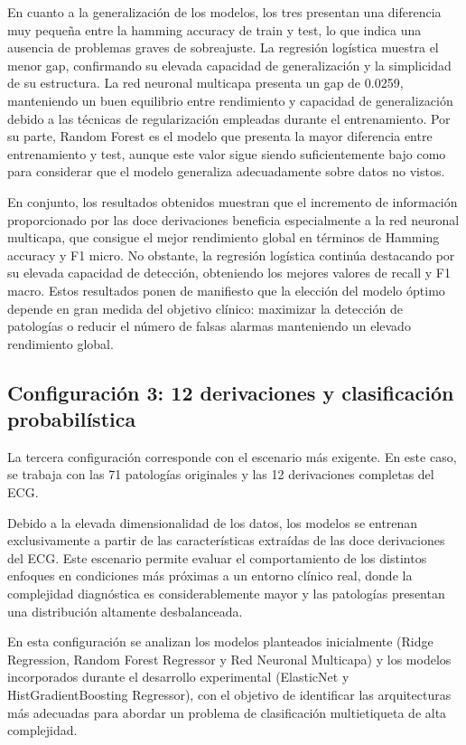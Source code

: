 \documentclass[12pt,a4paper,twoside]{book}
\begin{document}
En cuanto a la generalización de los modelos, los tres presentan una diferencia muy pequeña entre la hamming accuracy de train y test, lo que indica una ausencia de problemas graves de sobreajuste.
La regresión logística muestra el menor gap, confirmando su elevada capacidad de generalización y la simplicidad de su estructura. 
La red neuronal multicapa presenta un gap de 0.0259, manteniendo un buen equilibrio entre rendimiento y capacidad de generalización debido a las técnicas de regularización empleadas durante el entrenamiento. 
Por su parte, Random Forest es el modelo que presenta la mayor diferencia entre entrenamiento y test, aunque este valor sigue siendo suficientemente bajo como para considerar que el modelo generaliza adecuadamente sobre datos no vistos.

\vspace{0.5cm}

En conjunto, los resultados obtenidos muestran que el incremento de información proporcionado por las doce derivaciones beneficia especialmente a la red neuronal multicapa, que consigue el mejor rendimiento global en términos de Hamming accuracy y F1 micro. 
No obstante, la regresión logística continúa destacando por su elevada capacidad de detección, obteniendo los mejores valores de recall y F1 macro. 
Estos resultados ponen de manifiesto que la elección del modelo óptimo depende en gran medida del objetivo clínico: maximizar la detección de patologías o reducir el número de falsas alarmas manteniendo un elevado rendimiento global.

\subsection{Configuración 3: 12 derivaciones y clasificación probabilística}

La tercera configuración corresponde con el escenario más exigente. 
En este caso, se trabaja con las 71 patologías originales y las 12 derivaciones completas del ECG.

Debido a la elevada dimensionalidad de los datos, los modelos se entrenan exclusivamente a partir de las características extraídas de las doce derivaciones del ECG. 
Este escenario permite evaluar el comportamiento de los distintos enfoques en condiciones más próximas a un entorno clínico real, donde la complejidad diagnóstica es considerablemente mayor y las patologías presentan una distribución altamente desbalanceada.

En esta configuración se analizan los modelos planteados inicialmente (Ridge Regression, Random Forest Regressor y Red Neuronal Multicapa) y los modelos incorporados durante el desarrollo experimental (ElasticNet y HistGradientBoosting Regressor), con el objetivo de identificar las arquitecturas más adecuadas para abordar un problema de clasificación multietiqueta de alta complejidad.
\end{document}
